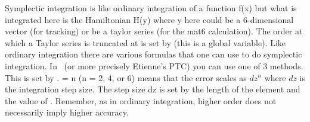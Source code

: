 Symplectic integration is like ordinary integration of a function f(x)
but what is integrated here is the Hamiltonian H(y) where y here could
be a 6-dimensional vector (for tracking) or be a taylor series (for
the mat6 calculation). The order at which a Taylor series is truncated
at is set by  (this is a global variable). Like
ordinary integration there are various formulas that one can use to do
symplectic integration. In \bmad\ (or more precisely Etienne's PTC)
you can use one of 3 methods. This is set by . 
 = n (n = 2, 4, or 6)
means that the error scales as $dz^n$ where $dz$ is the integration step
size. The step size dz is set by the length of the element and the
value of . Remember, as in ordinary integration, higher
order does not necessarily imply higher accuracy.
